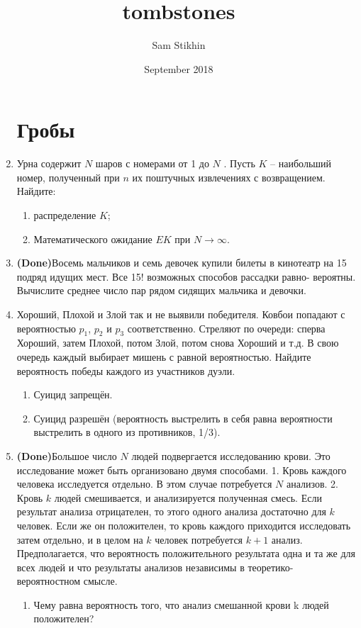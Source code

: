 \documentclass[a4paper, 14pt]{extarticle}
\title{tombstones}
\author{Sam Stikhin}
\date{September 2018}
\begin{document}
\begin{enumerate}
\section*{Гробы}
	\item  Урна содержит $N$ шаров с номерами от 1 до $N$ . Пусть $K$ --
наибольший номер, полученный при $n$ их поштучных извлечениях с
возвращением. Найдите:	\begin{enumerate}
	\item  распределение $K$;
	\item Математического ожидание $EK$ при $N\rightarrow\infty$.
\end{enumerate}
    \item \textbf{(Done)}Восемь мальчиков и семь девочек купили билеты в кинотеатр на
	15 подряд идущих мест. Все 15! возможных способов рассадки равно-
	вероятны. Вычислите среднее число пар рядом сидящих мальчика и
	девочки.
\item Хороший, Плохой и Злой так и не выявили победителя. Ковбои попадают с вероятностью $p_1$, $p_2$ и $p_3$ соответственно. Стреляют по очереди: сперва Хороший, затем Плохой, потом Злой, потом снова Хороший и т.д. В свою очередь каждый выбирает мишень с равной вероятностью. Найдите вероятность победы каждого из участников дуэли.
\begin{enumerate}
    \item Суицид запрещён.
    \item Суицид разрешён (вероятность выстрелить в себя равна вероятности выстрелить в одного из противников, 1/3).
\end{enumerate}
\item  \textbf{(Done)}Большое число $N$ людей подвергается исследованию
	крови. Это исследование может быть организовано двумя
	способами. 1. Кровь каждого человека исследуется отдельно.
	В этом случае потребуется $N$ анализов. 2. Кровь $k$ людей
	смешивается, и анализируется полученная смесь. Если  
	результат анализа отрицателен, то этого одного анализа  
	достаточно для $k$ человек. Если же он положителен, то кровь  
	каждого приходится исследовать затем отдельно, и в целом на $k$
	человек потребуется $k+1$ анализ. Предполагается, что  
	вероятность положительного результата одна и та же для всех
	людей и что результаты анализов независимы в теоретико-
	вероятностном смысле.
	\begin{enumerate}
		\item Чему равна вероятность того, что анализ смешанной
	крови k людей положителен?

\end{enumerate}
\end{enumerate}
\end{document}
